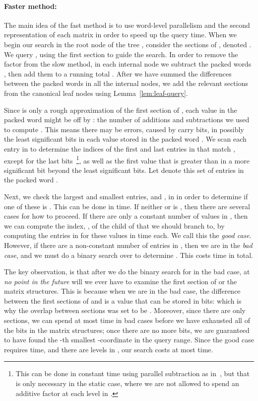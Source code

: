\documentclass{llncs}
\begin{document}
\paragraph{Faster method:} The main idea of the fast method is to use
word-level parallelism and the second representation of each matrix in
order to speed up the query time.  When we begin our search in the
root node  of the tree , consider the sections of , denoted
.  We query , using the first section  to
guide the search.  In order to remove the  factor from the slow
method, in each internal node  we subtract the packed words
, then add them to a running total .
After we have summed the differences between the packed words in all
the internal nodes, we add the relevant sections from the canonical
leaf nodes using Lemma~\ref{lem:leaf-query}.

Since  is only a rough approximation of the first section of
, each value in the packed word might be off by : the number of additions and subtractions we used to compute
.  This means there may be errors, caused by carry bits, in
possibly the  least significant bits in each value
stored in the packed word .  We scan each entry in  to
determine the indices of the first and last entries in  that
match , except for the last  bits~\footnote{This
  can be done in constant time using parallel subtraction as
  in~\cite{BGJS10}, but that is only necessary in the static case,
  where we are not allowed to spend an additive  factor at each level in .}, as well as the first value that
is greater than  in a more significant bit beyond the  least significant bits.  Let  denote
this set of entries in the packed word .

Next, we check the largest and smallest entries,  and , in
 in order to determine if one of these is .  This can be done
in  time. If neither  or  is ,
then there are several cases for how to proceed.  If there are only a
constant number of values in , then we can compute the index,
, of the child of  that we should branch to, by computing the
entries in  for these values in  time each.
We call this the \emph{good case}.  However, if there are a
non-constant number of entries in , then we are in the \emph{bad
  case}, and we must do a binary search over  to determine .
This costs  time in
total.

The key observation, is that after we do the binary search for 
in the bad case, at \emph{no point in the future} will we ever have to
examine the first section of  or the matrix structures.  This is
because when we are in the bad case, the difference between the first
sections of  and  is a value that can be
stored in  bits: which is why the overlap between
sections was set to be .  Moreover, since there are
only  sections, we can spend at most
 time in bad
cases before we have exhausted all of the bits in the matrix
structures; once there are no more bits, we are guaranteed to have
found the -th smallest -coordinate in the query range.  Since
the good case requires  time, and there are
 levels in , our search costs at most  time.
\end{document}
